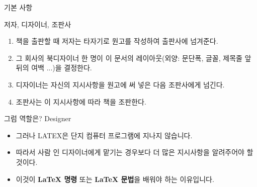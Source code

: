 \documentclass[10pt, mathserif, aspectratio=169]{beamer}
\begin{document}
\begin{frame}{기본 사항}
\begin{block}{저자, 디자이너, 조판사}
  \begin{enumerate}
    \item 책을 출판할 때 저자는 타자기로 원고를 작성하여 출판사에 넘겨준다.
    \item 그 회사의 북디자이너 한 명이 이 문서의 레이아웃(외양: 문단폭, 글꼴, 제목줄 앞 뒤의 여백 ...)을 결정한다.
    \item 디자이너는 자신의 지시사항을 원고에 써 넣은 다음 조판사에게 넘긴다.
    \item 조판사는 이 지시사항에 따라 책을 조판한다.
  \end{enumerate}
\end{block}

\pause
\vspace{0.5ex}

\begin{block}{\center 그럼  역할은?}
\pause
\center {} Designer
\end{block}

\pause
\vspace{0.5ex}

\begin{block}{}
  \begin{itemize}
    \item 그러나 LATEX은 단지 컴퓨터 프로그램에 지나지 않습니다.
    \item 따라서 사람 인 디자이너에게 맡기는 경우보다 더 많은 지시사항을 알려주어야 할 것이다.
    \item 이것이 {\bf \LaTeX{} 명령} 또는 {\bf \LaTeX{} 문법}을 배워야 하는 이유입니다.
  \end{itemize}
\end{block}

\end{frame}
\end{document}
